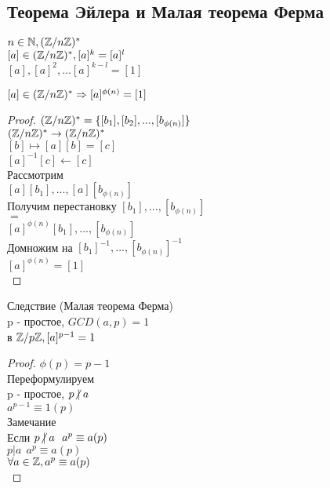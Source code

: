 \subsection{Теорема Эйлера и Малая теорема Ферма} 
$ n \in \mathbb{N}, (\mathbb{Z} / n\mathbb{Z})^* $ \\
$ [a] \in  (\mathbb{Z} / n\mathbb{Z})^*, [a]^k = [a]^l $ \\
$ [a], [a]^2, ... [a]^{k-l} = [1] $ \\
\begin{theorem}
	$ [a] \in (\mathbb{Z} / n\mathbb{Z})^* \Rightarrow [a]^{\phi(n)} = [1] $ \\
	\begin{proof}
		$ (\mathbb{Z} / n\mathbb{Z})^* = \{ [b_1], [b_2], ..., [b_{\phi(n)}]  \} $ \\
		$  (\mathbb{Z} / n\mathbb{Z})^* \rightarrow  (\mathbb{Z} / n\mathbb{Z})^* $ \\
		$ [b] \mapsto [a][b] = [c] $ \\
		$ [a]^{-1} [c] \leftarrow [c] $ \\
		Рассмотрим \\
		$ [a][b_1] , ..., [a][b_{\phi(n)}] $ \\
		Получим перестановку
		$ [b_1] , ..., [b_{\phi(n)}] $ \\
		$ = $ \\
		$ [a]^{\phi(n)} [b_1] , ..., [b_{\phi(n)}] $ \\
		Домножим на  $ [b_1]^{-1} , ..., [b_{\phi(n)}]^{-1} $ \\
		$ [a]^{\phi(n)} = [1] $ \\
	\end{proof}
\end{theorem}
Следствие (Малая теорема Ферма)\\
p - простое, $GCD(a, p) = 1$ \\
в $ \mathbb{Z} / p\mathbb{Z}, [a]^{p-1} = 1  $ 
\begin{proof}
	$ \phi(p) = p -1 $ \\
	Переформулируем \\
	p - простое, $ p \centernot| a $ \\
	$ a^{p-1} \equiv 1 (p) $ \\
	Замечание \\
	Если $ p \centernot| a \ \ a^p \equiv a(p)$ \\
	$ p | a \ \ a^p \equiv a(p)$ \\
	$ \forall a \in \mathbb{Z}, a^p \equiv a (p) $ \\
	
\end{proof} 


